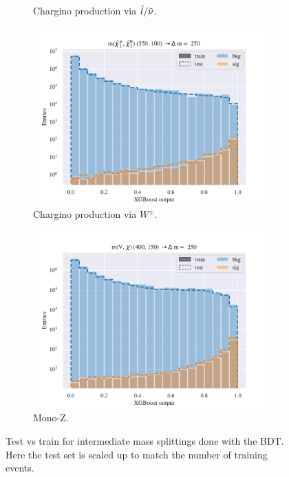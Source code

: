 \begin{figure}[H]
\begin{subfigure}[t!]{0.49\textwidth}
        \caption{Chargino production via $\Tilde{l}/\Tilde{\nu}$.}
        \label{fig:SlepsnuInter}
    \end{subfigure}
    \begin{subfigure}[t!]{0.49\textwidth}
        \includegraphics[width = \textwidth]{Figures/WW/BDT/All_level/Inter/scaled_train_test_395320.pdf}
        \caption{Chargino production via $W^\pm$.}
        \label{fig:WWInter}
    \end{subfigure}
    \begin{subfigure}[t!]{0.49\textwidth}
        \includegraphics[width = \textwidth]{Figures/Mono_Z/ML/BDT/All_level/Inter/scaled_train_test_310613.pdf}
        \caption{Mono-Z.}
        \label{fig:MonoInter}
    \end{subfigure}
    \caption{Test vs train for intermediate mass splittings done with the BDT. Here the test set is scaled up to match the number of training events.}
    \label{fig:AllInterBDT}
\end{figure}

